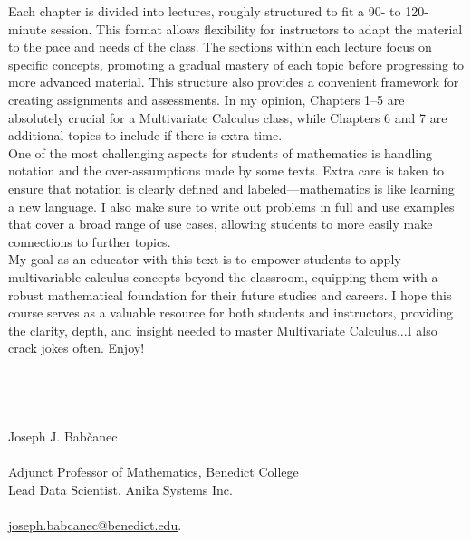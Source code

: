 \noindent Each chapter is divided into lectures, roughly structured to fit a 90- to 120-minute session. This format allows flexibility for instructors to adapt the material to the pace and needs of the class. The sections within each lecture focus on specific concepts, promoting a gradual mastery of each topic before progressing to more advanced material. This structure also provides a convenient framework for creating assignments and assessments. In my opinion, Chapters 1–5 are absolutely crucial for a Multivariate Calculus class, while Chapters 6 and 7 are additional topics to include if there is extra time. \\

\noindent One of the most challenging aspects for students of mathematics is handling notation and the over-assumptions made by some texts. Extra care is taken to ensure that notation is clearly defined and labeled—mathematics is like learning a new language. I also make sure to write out problems in full and use examples that cover a broad range of use cases, allowing students to more easily make connections to further topics. \\

\noindent My goal as an educator with this text is to empower students to apply multivariable calculus concepts beyond the classroom, equipping them with a robust mathematical foundation for their future studies and careers. I hope this course serves as a valuable resource for both students and instructors, providing the clarity, depth, and insight needed to master Multivariate Calculus...I also crack jokes often. Enjoy!
\\
\\
\\
\\
\\
Joseph J. Babčanec
\\
\\
Adjunct Professor of Mathematics, Benedict College
\\
Lead Data Scientist, Anika Systems Inc.
\\
\\
\href{mailto:joseph.babcanec@benedict.edu}{joseph.babcanec@benedict.edu}.